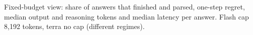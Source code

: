 \begin{table}[!htbp]
\centering
\caption{Fixed-budget view: share of answers that finished and parsed, one-step regret, median output and reasoning tokens and median latency per answer. Flash cap 8{,}192 tokens, terra no cap (different regimes).}
\label{tab:llm-budget}
\scriptsize
\setlength{\tabcolsep}{3pt}

\end{table}
